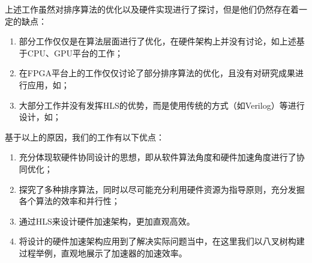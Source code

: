 上述工作虽然对排序算法的优化以及硬件实现进行了探讨，但是他们仍然存在着一定的缺点：
\begin{enumerate}
    \item 部分工作仅仅是在算法层面进行了优化，在硬件架构上并没有讨论，如上述基于CPU、GPU平台的工作\cite{zurek2013comparison, jan2012fast}；
    \item 在FPGA平台上的工作仅仅讨论了部分排序算法的优化，且没有对研究成果进行应用，如\cite{georgopoulos2016evaluation,chen2015energy, matai2016resolve, purnomo2016implementation}；
    \item 大部分工作并没有发挥HLS的优势，而是使用传统的方式（如Verilog）等进行设计，如\cite{chen2015energy, purnomo2016implementation}；
\end{enumerate}

基于以上的原因，我们的工作有以下优点：
\begin{enumerate}
    \item 充分体现软硬件协同设计的思想，即从软件算法角度和硬件加速角度进行了协同优化；
    \item 探究了多种排序算法，同时以尽可能充分利用硬件资源为指导原则，充分发掘各个算法的效率和并行性；
    \item 通过HLS来设计硬件加速架构，更加直观高效。
    \item 将设计的硬件加速架构应用到了解决实际问题当中，在这里我们以八叉树构建过程举例，直观地展示了加速器的加速效率。
\end{enumerate}


